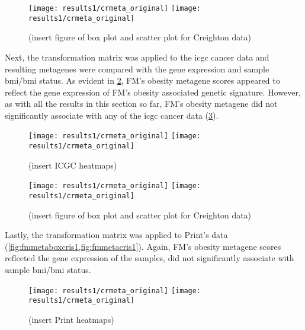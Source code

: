 \begin{figure}[htp!]
	\centering
	\texttt{[image: results1/crmeta\_original]}
	\hfill
	\texttt{[image: results1/crmeta\_original]}
	\caption[FM metagene and sample \gls{bmi}/\gls{bmi} status in Creighton's data]{(insert figure of box plot and scatter plot for Creighton data)}
	\label{fig:fmmetaboxcr1}
\end{figure}

Next, the transformation matrix was applied to the \gls{icgc} cancer data and resulting metagenes were compared with the gene expression and sample \gls{bmi}/\gls{bmi} status.
As evident in \cref{fig:fmmetaicgc1}, FM's obesity metagene scores appeared to reflect the gene expression of FM's obesity associated genetic signature.
However, as with all the results in this section so far, FM's obesity metagene did not significantly associate with any of the \gls{icgc} cancer data (\cref{fig:fmmetaboxicgc1}).

\begin{figure}[htp!]
	\centering
	\texttt{[image: results1/crmeta\_original]}
	\hfill
	\texttt{[image: results1/crmeta\_original]}
	\caption[FM metagene and \gls{icgc} cancer data]{(insert ICGC heatmaps)}
	\label{fig:fmmetaicgc1}
\end{figure}

\begin{figure}[htp!]
	\centering
	\texttt{[image: results1/crmeta\_original]}
	\hfill
	\texttt{[image: results1/crmeta\_original]}
	\caption[FM metagene and sample \gls{bmi}/\gls{bmi} status in \gls{icgc} data]{(insert figure of box plot and scatter plot for Creighton data)}
	\label{fig:fmmetaboxicgc1}
\end{figure}

Lastly, the transformation matrix was applied to Print's data (\cref{fig:fmmetaboxcris1,fig:fmmetacris1}).
Again, FM's obesity metagene scores reflected the gene expression of the samples, did not significantly associate with sample \gls{bmi}/\gls{bmi} status.
\\

\begin{figure}[htp!]
	\centering
	\texttt{[image: results1/crmeta\_original]}
	\hfill
	\texttt{[image: results1/crmeta\_original]}
	\caption[FM metagene and Print's cancer data]{(insert Print heatmaps)}
	\label{fig:fmmetacris1}
\end{figure}

